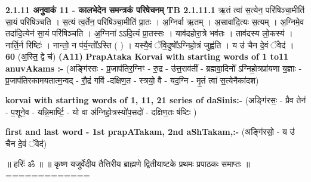 \documentclass[17pt]{extarticle}
\begin{document}
                \textbf{ 2.1.11    अनुवाकं   11 - कालभेदेन समन्त्रकं परिषेचनम्} \newline
                                \textbf{ TB 2.1.11.1} \newline
                  ऋ॒तं त्वा॑ स॒त्येन॒ परि॑षिञ्चा॒मीति॑ सा॒यं परि॑षिञ्चति । स॒त्यं त्व॒र्तेन॒ परि॑षिञ्चा॒मीति॑ प्रा॒तः । अ॒ग्निर्वा ऋ॒तम् । अ॒सावा॑दि॒त्यः स॒त्यम् । अ॒ग्निमे॒व तदा॑दि॒त्येन॑ सा॒यं परि॑षिञ्चति । अ॒ग्निना॑ ऽऽदि॒त्यं प्रा॒तस्सः । याव॑दहोरा॒त्रे भव॑तः । ताव॑दस्य लो॒कस्य॑ । नार्ति॒र्न रिष्टिः॑ । नान्तो॒ न प॑र्य॒न्तो᳚ऽस्ति ( ) । यस्यै॒वं ॅवि॒दुषो᳚ऽग्निहो॒त्रं जुह्व॑ति । य उ॑ चैन दे॒वं ॅवेद॑ । \textbf{ 60} \newline
                  \newline
                                    (अ॒स्ति॒ द्वे च॑) \textbf{(A11)} \newline \newline
                \textbf{PrapAtaka Korvai with starting  words of 1 to11 anuvAkams :-} \newline
        (अङ्गि॑रसः - प्र॒जाप॑तिर॒ग्निꣳ - रु॒द्र - उ॑त्त॒राव॑तीं - ब्रह्मवा॒दिनो᳚ ऽग्निहो॒त्रप्रा॑यणा य॒ज्ञाः - प्र॒जाप॑तिरकामयतात्म॒न्वद् - रौ॒द्रं गवि॑ -दक्षिण॒त - स्त्रयो॒ वै - यद॒ग्नि - मृ॒तं त्वा॑ स॒त्येनैका॑दश) \newline

        \textbf{korvai with starting words of 1, 11, 21 series of daSinis:-} \newline
        (अङ्गि॑रसः॒ - प्रैव तेन॑ - प॒शूने॒व - यन्नि॒मार्ष्टि॒ - यो वा अ॑ग्निहो॒त्रस्यो॑प॒सदो॑ - दक्षिण॒तः ष॑ष्टिः ) \newline

        \textbf{first and last  word - 1st prapATakam, 2nd aShTakam,:-} \newline
        (अङ्गि॑रसो॒ - य उ॑ चैन दे॒वं ॅवेद॑) \newline 

       

        ॥ हरिः॑ ॐ ॥
॥ कृष्ण यजुर्वेदीय तैत्तिरीय ब्राह्मणे द्वितीयाष्टके प्रथमः प्रपाठकः समाप्तः ॥
============= \newline
        \pagebreak
        
        
        
\end{document}
